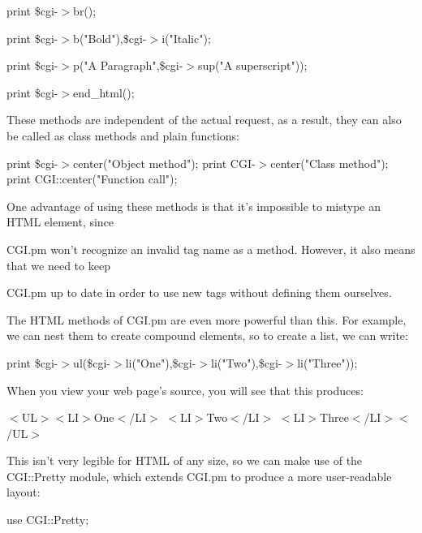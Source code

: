 \documentclass[a4paper,11pt]{book}
\begin{document}
\noindent print \$cgi-$>$br();

\noindent print \$cgi-$>$b("Bold"),\$cgi-$>$i("Italic");

\noindent print \$cgi-$>$p("A Paragraph",\$cgi-$>$sup("A superscript"));

\noindent 

\noindent print \$cgi-$>$end\_html();

\noindent 

\noindent These methods are independent of the actual request, as a result, they can also be called as class methods and plain functions:

\noindent 

\noindent print \$cgi-$>$center("Object method"); print CGI-$>$center("Class method"); print CGI::center("Function call");

\noindent 

\noindent One advantage of using these methods is that it's impossible to mistype an HTML element, since

\noindent CGI.pm won't recognize an invalid tag name as a method. However, it also means that we need to keep

\noindent CGI.pm up to date in order to use new tags without defining them ourselves.

\noindent 

\noindent The HTML methods of CGI.pm are even more powerful than this. For example, we can nest them to create compound elements, so to create a list, we can write:

\noindent 

\noindent 

\noindent print \$cgi-$>$ul(\$cgi-$>$li("One"),\$cgi-$>$li("Two"),\$cgi-$>$li("Three"));

\noindent 

\noindent When you view your web page's source, you will see that this produces:

\noindent 

\noindent 

\noindent $<$UL$>$$<$LI$>$One$<$/LI$>$ $<$LI$>$Two$<$/LI$>$ $<$LI$>$Three$<$/LI$>$$<$/UL$>$

\noindent 

\noindent This isn't very legible for HTML of any size, so we can make use of the CGI::Pretty module, which extends CGI.pm to produce a more user-readable layout:

\noindent 

\noindent use CGI::Pretty;
\end{document}
